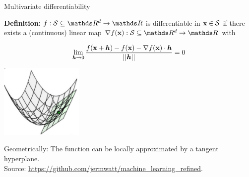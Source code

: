 \begin{vbframe}{Multivariate differentiability}

\textbf{Definition: }$f: \mathcal{S}\subseteq \R^d \to \R$ is differentiable in $\mathbf{x} \in \mathcal{S}$ if there exists a (continuous) linear map $\nabla f(\xv): \mathcal{S}\subseteq \R^d \to \R$ with %

$$
\lim_{\bm{h} \to 0} \frac{f(\mathbf{x} + \bm{h}) - f(\mathbf{x}) - \nabla f(\mathbf{x}) \cdot \bm{h}}{||\bm{h}||} = 0
$$

\begin{center}
\includegraphics[width = 0.3\textwidth]{figure_man/differentiability_multivariate.png} \\
\begin{footnotesize}
Geometrically: The function can be locally approximated by a tangent hyperplane. \\
Source: \url{https://github.com/jermwatt/machine_learning_refined}.
\end{footnotesize}
\end{center}

\end{vbframe}

